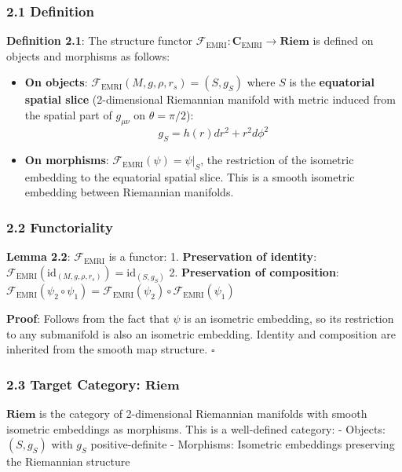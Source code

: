 \documentclass[
]{article}
\begin{document}
\subsubsection{2.1 Definition}\label{definition}

\textbf{Definition 2.1}: The structure functor
\(\mathcal{F}_{\text{EMRI}}: \mathbf{C}_{\text{EMRI}} \to \mathbf{Riem}\)
is defined on objects and morphisms as follows:

\begin{itemize}
\item
  \textbf{On objects}:
  \(\mathcal{F}_{\text{EMRI}}(M, g, \rho, r_s) = (S, g_S)\) where \(S\)
  is the \textbf{equatorial spatial slice} (2-dimensional Riemannian
  manifold with metric induced from the spatial part of \(g_{\mu\nu}\)
  on \(\theta = \pi/2\)): \[g_S = h(r)dr^2 + r^2 d\phi^2\]
\item
  \textbf{On morphisms}: \(\mathcal{F}_{\text{EMRI}}(\psi) = \psi|_S\),
  the restriction of the isometric embedding to the equatorial spatial
  slice. This is a smooth isometric embedding between Riemannian
  manifolds.
\end{itemize}

\subsubsection{2.2 Functoriality}\label{functoriality}

\textbf{Lemma 2.2}: \(\mathcal{F}_{\text{EMRI}}\) is a functor: 1.
\textbf{Preservation of identity}:
\(\mathcal{F}_{\text{EMRI}}(\text{id}_{(M,g,\rho,r_s)}) = \text{id}_{(S, g_S)}\)
2. \textbf{Preservation of composition}:
\(\mathcal{F}_{\text{EMRI}}(\psi_2 \circ \psi_1) = \mathcal{F}_{\text{EMRI}}(\psi_2) \circ \mathcal{F}_{\text{EMRI}}(\psi_1)\)

\textbf{Proof}: Follows from the fact that \(\psi\) is an isometric
embedding, so its restriction to any submanifold is also an isometric
embedding. Identity and composition are inherited from the smooth map
structure. \(\square\)

\subsubsection{\texorpdfstring{2.3 Target Category:
\(\mathbf{Riem}\)}{2.3 Target Category: \textbackslash mathbf\{Riem\}}}\label{target-category-mathbfriem}

\(\mathbf{Riem}\) is the category of 2-dimensional Riemannian manifolds
with smooth isometric embeddings as morphisms. This is a well-defined
category: - Objects: \((S, g_S)\) with \(g_S\) positive-definite -
Morphisms: Isometric embeddings preserving the Riemannian structure
\end{document}

